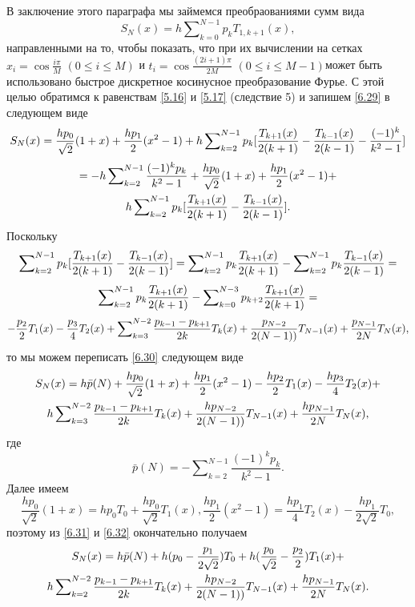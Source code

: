 В заключение этого параграфа мы займемся преобраованиями сумм вида
\begin{equation}\label{6.29}
 S_N(x)=h\sum\nolimits_{k=0}^{N-1}p_kT_{1,k+1}(x),
\end{equation}
направленными на то, чтобы показать, что при их вычислении на сетках $x_i=\cos\frac{i\pi}{M}$ $(0\le i\le M)$ и $t_i=\cos\frac{(2i+1)\pi}{2M}$ $(0\le i\le M-1)$может быть использовано быстрое дискретное косинусное преобразование Фурье. С этой целью обратимся к равенствам \eqref{5.16} и \eqref{5.17} (следствие 5) и запишем  \eqref{6.29} в следующем виде
$$
S_N(x)=\frac{hp_0}{\sqrt{2}}(1+x)+\frac{hp_1}2(x^2-1)+ h\sum\nolimits_{k=2}^{N-1}p_k[{T_{k+1}(x)\over2(k+1)}- {T_{k-1}(x)\over2(k-1)} -\frac{(-1)^k}{k^2-1}]
$$
\begin{multline}\label{6.30}
  =-h\sum\nolimits_{k=2}^{N-1} \frac{(-1)^kp_k}{k^2-1}+\frac{hp_0}{\sqrt{2}}(1+x)+\frac{hp_1}2(x^2-1)+
 \\
  h\sum\nolimits_{k=2}^{N-1}p_k[{T_{k+1}(x)\over2(k+1)}- {T_{k-1}(x)\over2(k-1)} ].
\end{multline}
Поскольку
$$
\sum\nolimits_{k=2}^{N-1}p_k[{T_{k+1}(x)\over2(k+1)}- {T_{k-1}(x)\over2(k-1)} ]=
\sum\nolimits_{k=2}^{N-1}p_k{T_{k+1}(x)\over2(k+1)}-\sum\nolimits_{k=2}^{N-1}p_k{T_{k-1}(x)\over2(k-1)}=
$$
$$
\sum\nolimits_{k=2}^{N-1}p_k{T_{k+1}(x)\over2(k+1)}-\sum\nolimits_{k=0}^{N-3}p_{k+2}{T_{k+1}(x)\over2(k+1)}=
$$
$$
-{p_{2}\over2}T_{1}(x)-{p_{3}\over4}T_{2}(x)+\sum\nolimits_{k=3}^{N-2}{p_{k-1}-p_{k+1}\over2k}T_k(x)
+{p_{N-2}\over2(N-1))}T_{N-1}(x)+{p_{N-1}\over2N}T_{N}(x),
$$
то   мы можем переписать \eqref{6.30}   следующем виде
\begin{multline}\label{6.31}
 S_N(x)=h\bar p(N)+\frac{hp_0}{\sqrt{2}}(1+x)+\frac{hp_1}2(x^2-1)-{hp_{2}\over2}T_{1}(x)-{hp_{3}\over4}T_{2}(x)+
 \\
h\sum\nolimits_{k=3}^{N-2}{p_{k-1}-p_{k+1}\over2k}T_k(x)
+{hp_{N-2}\over2(N-1))}T_{N-1}(x)+{hp_{N-1}\over2N}T_{N}(x),
  \end{multline}
где
\begin{equation}\label{6.32}
 \bar p(N)= -\sum\nolimits_{k=2}^{N-1} \frac{(-1)^kp_k}{k^2-1}.
\end{equation}
 Далее имеем
$$
\frac{hp_0}{\sqrt{2}}(1+x)=hp_0T_0+\frac{hp_0}{\sqrt{2}}T_1(x), \frac{hp_1}2(x^2-1)= \frac{hp_1}4T_2(x) -\frac{hp_1}{2\sqrt{2}}T_0,
$$
поэтому из \eqref{6.31} и  \eqref{6.32} окончательно получаем
\begin{multline}\label{6.33}
 S_N(x)=h\bar p(N)+h(p_0-\frac{p_1}{2\sqrt{2}})T_0+h(\frac{p_0}{\sqrt{2}}-{p_{2}\over2})T_1(x)+
 \\
h\sum\nolimits_{k=2}^{N-2}{p_{k-1}-p_{k+1}\over2k}T_k(x)
+{hp_{N-2}\over2(N-1))}T_{N-1}(x)+{hp_{N-1}\over2N}T_{N}(x).
  \end{multline}


















